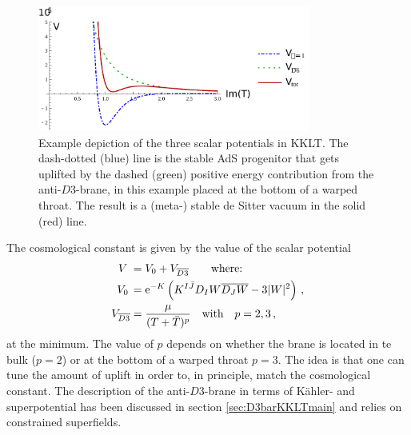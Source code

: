 \documentclass[a4paper,12pt,twoside,openright]{report}
\newcommand{\bea}{\begin{equation}\begin{aligned}}
\newcommand{\eea}{\end{aligned}\end{equation}}
\def\rme{{\rm e}}
\begin{document}
\begin{figure}[htp]
     \centering
     \includegraphics[trim=0 0 100 20,clip,width=0.8\textwidth]{kklt_example_3.pdf}
     \caption{Example depiction of the three scalar potentials in KKLT. The dash-dotted (blue) line is the stable AdS progenitor that gets uplifted by the dashed (green) positive energy contribution from the anti-$D3$-brane, in this example placed at the bottom of a warped throat. The result is a (meta-) stable de Sitter vacuum in the solid (red) line.}
     \label{fig:KKLTscalpot}
\end{figure}
The cosmological constant is given by the value of the scalar potential
\bea
V\; &= V_{0} + V_{\overline{D3}} \qquad \text{where:}\\
V_{0}\, &= \rme^{-K} \left( K^{I\bar{J}} D_I W \overline{D_J W} - 3 |W|^2\right)\,,\\
V_{\overline{D3}} &= \frac{\mu}{(T + \bar{T})^p} \quad \text{with} \quad p=2,3\,,
\eea
at the minimum. The value of $p$ depends on whether the brane is located in te bulk ($p=2$) or at the bottom of a warped throat $p=3$. The idea is that one can tune the amount of uplift in order to, in principle, match the cosmological constant. The description of the anti-$D3$-brane in terms of Kähler- and superpotential has been discussed in section \ref{sec:D3barKKLTmain} and relies on constrained superfields.\\
\end{document}

